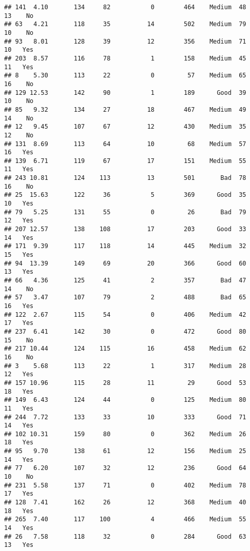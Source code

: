 \documentclass[
]{article}
\begin{document}
\begin{verbatim}
## 141  4.10       134     82           0        464    Medium  48        13    No
## 63   4.21       118     35          14        502    Medium  79        10    No
## 93   8.01       128     39          12        356    Medium  71        10   Yes
## 203  8.57       116     78           1        158    Medium  45        11   Yes
## 8    5.30       113     22           0         57    Medium  65        16    No
## 129 12.53       142     90           1        189      Good  39        10    No
## 85   9.32       134     27          18        467    Medium  49        14    No
## 12   9.45       107     67          12        430    Medium  35        12    No
## 131  8.69       113     64          10         68    Medium  57        16   Yes
## 139  6.71       119     67          17        151    Medium  55        11   Yes
## 243 10.81       124    113          13        501       Bad  78        16    No
## 25  15.63       122     36           5        369      Good  35        10   Yes
## 79   5.25       131     55           0         26       Bad  79        12   Yes
## 207 12.57       138    108          17        203      Good  33        14   Yes
## 171  9.39       117    118          14        445    Medium  32        15   Yes
## 94  13.39       149     69          20        366      Good  60        13   Yes
## 66   4.36       125     41           2        357       Bad  47        14    No
## 57   3.47       107     79           2        488       Bad  65        16   Yes
## 122  2.67       115     54           0        406    Medium  42        17   Yes
## 237  6.41       142     30           0        472      Good  80        15    No
## 217 10.44       124    115          16        458    Medium  62        16    No
## 3    5.68       113     22           1        317    Medium  28        12   Yes
## 157 10.96       115     28          11         29      Good  53        18   Yes
## 149  6.43       124     44           0        125    Medium  80        11   Yes
## 244  7.72       133     33          10        333      Good  71        14   Yes
## 102 10.31       159     80           0        362    Medium  26        18   Yes
## 95   9.70       138     61          12        156    Medium  25        14   Yes
## 77   6.20       107     32          12        236      Good  64        10    No
## 231  5.58       137     71           0        402    Medium  78        17   Yes
## 128  7.41       162     26          12        368    Medium  40        18   Yes
## 265  7.40       117    100           4        466    Medium  55        14   Yes
## 26   7.58       118     32           0        284      Good  63        13   Yes

\end{verbatim}
\end{document}
